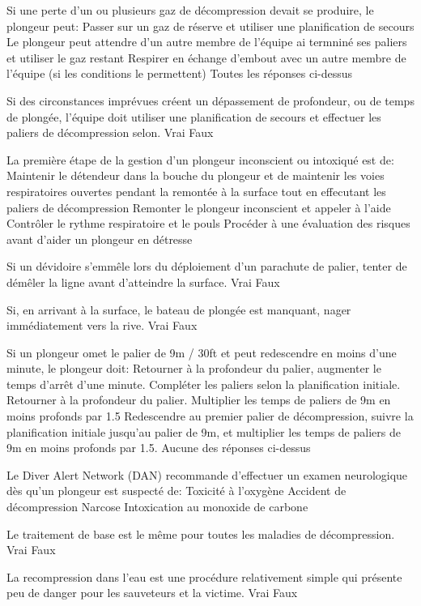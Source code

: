 \documentclass[english,10pt,a4paper,twoside]{article}
\begin{document}
\begin{outline}
		\1 Si une perte d'un ou plusieurs gaz de décompression devait se produire, le plongeur peut:
			\2 Passer sur un gaz de réserve et utiliser une planification de secours
			\2 Le plongeur peut attendre d'un autre membre de l'équipe ai termniné ses paliers et utiliser le gaz restant
			\2 Respirer en échange d'embout avec un autre membre de l'équipe (si les conditions le permettent)
			\2 Toutes les réponses ci-dessus

		\1 Si des circonstances imprévues créent un dépassement de profondeur, ou de temps de plongée, l'équipe doit utiliser une planification de secours et effectuer les paliers de décompression selon.
			\2 Vrai
			\2 Faux

		\1 La première étape de la gestion d'un plongeur inconscient ou intoxiqué est de:
			\2 Maintenir le détendeur dans la bouche du plongeur et de maintenir les voies respiratoires ouvertes pendant la remontée à la surface tout en effecutant les paliers de décompression
			\2 Remonter le plongeur inconscient et appeler à l'aide
			\2 Contrôler le rythme respiratoire et le pouls
			\2 Procéder à une évaluation des risques avant d'aider un plongeur en détresse

		\1 Si un dévidoire s'emmêle lors du déploiement d'un parachute de palier, tenter de démêler la ligne avant d'atteindre la surface.
			\2 Vrai
			\2 Faux

		\1 Si, en arrivant à la surface, le bateau de plongée est manquant, nager immédiatement vers la rive.
			\2 Vrai
			\2 Faux

		\1 Si un plongeur omet le palier de 9m / 30ft et peut redescendre en moins d'une minute, le plongeur doit:
			\2 Retourner à la profondeur du palier, augmenter le temps d'arrêt d'une minute. Compléter les paliers selon la planification initiale.
			\2 Retourner à la profondeur du palier. Multiplier les temps de paliers de 9m en moins profonds par 1.5
			\2 Redescendre au premier palier de décompression, suivre la planification initiale jusqu'au palier de 9m, et multiplier les temps de paliers de 9m en moins profonds par 1.5.
			\2 Aucune des réponses ci-dessus

		\1 Le Diver Alert Network (DAN) recommande d'effectuer un examen neurologique dès qu'un plongeur est suspecté de:
			\2 Toxicité à l'oxygène
			\2 Accident de décompression
			\2 Narcose
			\2 Intoxication au monoxide de carbone

		\1 Le traitement de base est le même pour toutes les maladies de décompression.
			\2 Vrai
			\2 Faux

		\1 La recompression dans l'eau est une procédure relativement simple qui présente peu de danger pour les sauveteurs et la victime.
			\2 Vrai
			\2 Faux
	\end{outline}
	\vfill
	\pagebreak
\end{document}
